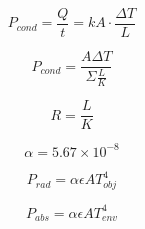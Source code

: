 \documentclass[11pt]{article}
\begin{document}
    \begin{minipage}{0.46\textwidth}
        \begin{equation}
            P_{cond} = \frac{Q}{t} = kA\cdot \frac{\Delta T}{L} \tag{conduction}
        \end{equation}
    \end{minipage}
    \begin{minipage}{0.5\textwidth}
        \begin{equation}
            P_{cond} = \frac{A \Delta T}{\Sigma \frac{L}{K} } \tag{conduction}
        \end{equation}
    \end{minipage}
    
    \vspace{0.4em}
    \begin{minipage}{0.46\textwidth}
        \begin{equation}
            R = \frac{L}{K} \tag{resistance}
        \end{equation}
    \end{minipage}
    \begin{minipage}{0.5\textwidth}
        \begin{equation}
            \alpha = 5.67 \times 10^{-8} \tag{Stefan-Boltzmann constant}
        \end{equation}
    \end{minipage}

    \begin{minipage}{0.46\textwidth}
        \begin{equation}
            P_{rad} = \alpha \epsilon A T_{obj}^4 \tag{radiation rate}
        \end{equation}
    \end{minipage}
    \begin{minipage}{0.5\textwidth}
        \begin{equation}
            P_{abs} = \alpha \epsilon A T_{env}^4 \tag{absorption rate}
        \end{equation}
    \end{minipage}
\end{document}
